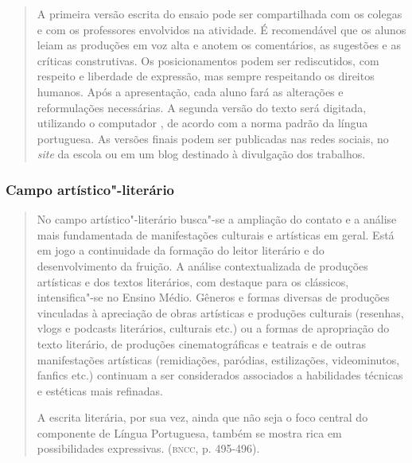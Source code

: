 \documentclass[11pt]{extarticle}
\begin{document}
\begin{enumerate}
\begin{quote}
A primeira versão escrita do ensaio pode ser compartilhada com os
colegas e com os professores envolvidos na atividade. É recomendável que
os alunos leiam as produções em voz alta e anotem os comentários, as
sugestões e as críticas construtivas. Os posicionamentos podem ser
rediscutidos, com respeito e liberdade de expressão, mas sempre
respeitando os direitos humanos. Após a apresentação, cada aluno fará as
alterações e reformulações necessárias. A segunda versão do texto será
digitada, utilizando o computador , de acordo com a norma padrão da
língua portuguesa. As versões finais podem ser publicadas nas redes
sociais, no \emph{site} da escola ou em um blog destinado à divulgação
dos trabalhos.
\end{quote}

\subsubsection{Campo artístico"-literário}

\begin{quote}
No campo artístico"-literário busca"-se a ampliação do contato e a
análise mais fundamentada de manifestações culturais e artísticas em
geral. Está em jogo a continuidade da formação do leitor literário e do
desenvolvimento da fruição. A análise contextualizada de produções
artísticas e dos textos literários, com destaque para os clássicos,
intensifica"-se no Ensino Médio. Gêneros e formas diversas de produções
vinculadas à apreciação de obras artísticas e produções culturais
(resenhas, vlogs e podcasts literários, culturais etc.) ou a formas de
apropriação do texto literário, de produções cinematográficas e teatrais
e de outras manifestações artísticas (remidiações, paródias,
estilizações, videominutos, fanfics etc.) continuam a ser considerados
associados a habilidades técnicas e estéticas mais refinadas.

A escrita literária, por sua vez, ainda que não seja o foco central do
componente de Língua Portuguesa, também se mostra rica em possibilidades
expressivas. (\textsc{bncc}, p. 495-496).
\end{quote}


\end{enumerate}
\end{document}
